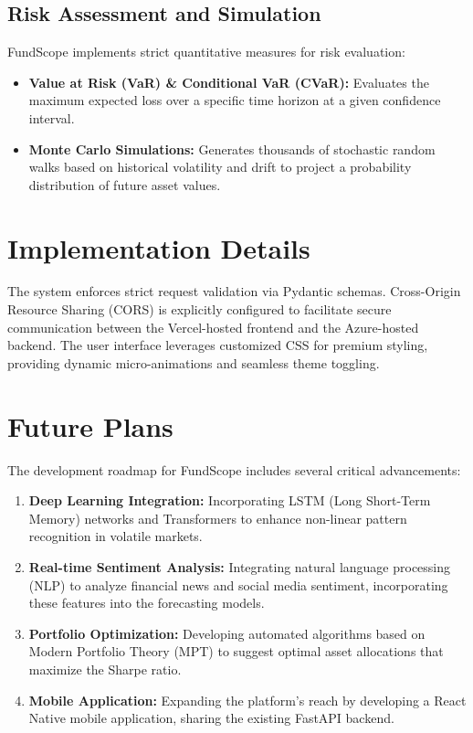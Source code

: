 \documentclass[conference]{IEEEtran}
\begin{document}
\subsection{Risk Assessment and Simulation}
FundScope implements strict quantitative measures for risk evaluation:
\begin{itemize}
    \item \textbf{Value at Risk (VaR) \& Conditional VaR (CVaR):} Evaluates the maximum expected loss over a specific time horizon at a given confidence interval.
    \item \textbf{Monte Carlo Simulations:} Generates thousands of stochastic random walks based on historical volatility and drift to project a probability distribution of future asset values.
\end{itemize}

\section{Implementation Details}
The system enforces strict request validation via Pydantic schemas. Cross-Origin Resource Sharing (CORS) is explicitly configured to facilitate secure communication between the Vercel-hosted frontend and the Azure-hosted backend. The user interface leverages customized CSS for premium styling, providing dynamic micro-animations and seamless theme toggling.

\section{Future Plans}
The development roadmap for FundScope includes several critical advancements:
\begin{enumerate}
    \item \textbf{Deep Learning Integration:} Incorporating LSTM (Long Short-Term Memory) networks and Transformers to enhance non-linear pattern recognition in volatile markets.
    \item \textbf{Real-time Sentiment Analysis:} Integrating natural language processing (NLP) to analyze financial news and social media sentiment, incorporating these features into the forecasting models.
    \item \textbf{Portfolio Optimization:} Developing automated algorithms based on Modern Portfolio Theory (MPT) to suggest optimal asset allocations that maximize the Sharpe ratio.
    \item \textbf{Mobile Application:} Expanding the platform's reach by developing a React Native mobile application, sharing the existing FastAPI backend.
\end{enumerate}
\end{document}

